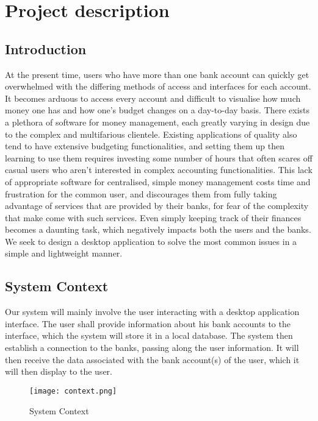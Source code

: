 \documentclass[11pt]{article}
\newcounter{use case ID}
\newcounter{req ID}
\begin{document}
\section{Project description}

\subsection{Introduction}
At the present time, users who have more than one bank account can quickly get overwhelmed with the differing methods of access and interfaces for each account. It becomes arduous to access every account and difficult to visualise how much money one has and how one's budget changes on a day-to-day basis. There exists a plethora of software for money management, each greatly varying in design due to the complex and multifarious clientele. Existing applications of quality also tend to have extensive budgeting functionalities, and setting them up then learning to use them requires investing some number of hours that often scares off casual users who aren't interested in complex accounting functionalities. This lack of appropriate software for centralised, simple money management costs time and frustration for the common user, and discourages them from fully taking advantage of services that are provided by their banks, for fear of the complexity that make come with such services. Even simply keeping track of their finances becomes a daunting task, which negatively impacts both the users and the banks. We seek to design a desktop application to solve the most common issues in a simple and lightweight manner.

\subsection{System Context}

Our system will mainly involve the user interacting with a desktop application interface. The user shall provide information about his bank accounts to the interface, which the system will store it in a local database. The system then establish a connection to the banks, passing along the user information. It will then receive the data associated with the bank account(s) of the user, which it will then display to the user.

\begin{figure}[htbp]
\texttt{[image: context.png]}
\caption{System Context}
\label{fig:system-context}
\end{figure}
\end{document}
